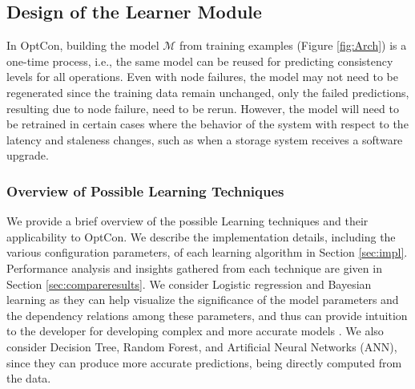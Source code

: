 \documentclass[conference]{IEEEtran}
\begin{document}
\subsection{Design of the Learner Module}\label{sec:approach}
In OptCon, building the model $\mathcal{M}$ from training examples (Figure \ref{fig:Arch}) is a one-time process, i.e., the same model can be reused for predicting consistency levels for all operations. Even with node failures, the model may not need to be regenerated since the training data remain unchanged, only the failed predictions, resulting due to node failure, need to be rerun.
 However, the model will need to be retrained in certain cases where the behavior of the system with respect to
 the latency and staleness changes, such as when a storage system receives a software upgrade. \subsubsection{Overview of Possible Learning Techniques}\label{sec:strategies}
We provide a brief overview of the possible Learning techniques and their applicability to OptCon. We describe the implementation details, including the various configuration parameters, of each learning algorithm in Section \ref{sec:impl}. Performance analysis and insights gathered from each technique are given in Section \ref{sec:compareresults}.  We consider Logistic regression and Bayesian learning as they can help  visualize the significance of the model parameters and the dependency relations among these parameters, and thus can provide intuition to the developer for developing complex and more accurate models \cite{Flach:2012:MLA:2490546}.
We also consider Decision Tree, Random Forest, and Artificial Neural Networks (ANN), since they can produce more accurate predictions, being directly computed from the data.
\end{document}
